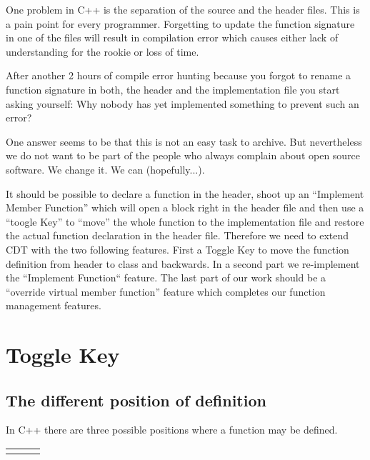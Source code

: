 \documentclass[a4paper,10pt,abstract=on]{scrreprt}
\begin{document}
One  problem in C++ is the separation of the source and the header files. This is a pain point for every programmer. Forgetting to update the function signature in one of the files will result in compilation error which causes either lack of understanding for the rookie or loss of time.

After another 2 hours of compile error hunting because you forgot to rename a function signature in both, the header and the implementation file you start asking yourself: Why nobody has yet implemented something to prevent such an error?

One answer seems to be that this is not an easy task to archive. But nevertheless we do not want to be part of the people who always complain about open source software. We change it. We can (hopefully...).

It should be possible to declare a function in the header, shoot up an ``Implement Member Function'' which will open a block right in the header file and then use a ``toogle Key'' to ``move'' the whole function to the implementation file and restore the actual function declaration in the header file. Therefore we need to extend CDT with the two following features. First a Toggle Key to move the function definition from header to class and backwards. In a second part we re-implement the ``Implement Function`` feature. The last part of our work should be a ``override virtual member function'' feature which completes our function management features.

\section{Toggle Key}
\subsection{The different position of definition}

In C++ there are three possible positions where a function may be defined.




\begin{tabular}{p{5cm}p{.5cm}p{6cm}}

& &

\end{tabular}
\end{document}
